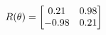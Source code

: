 \documentclass[preview]{standalone}
\begin{document}
\begin{align*}
\special{dvisvgm:raw <g id='unique000'>}R(\theta) = \begin{bmatrix}0.21 & 0.98\\-0.98 & 0.21\end{bmatrix}\special{dvisvgm:raw </g>}
\end{align*}
\end{document}
